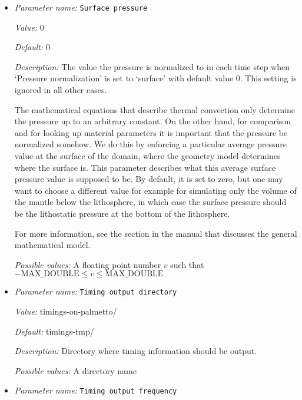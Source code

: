 \begin{itemize}
{\it Possible values:} A floating point number $v$ such that $-\text{MAX\_DOUBLE} \leq v \leq \text{MAX\_DOUBLE}$
\item {\it Parameter name:} {\tt Surface pressure}
\label{parameters:Surface pressure}
\label{parameters:Surface_20pressure}


{\it Value:} 0


{\it Default:} 0


{\it Description:} The value the pressure is normalized to in each time step when `Pressure normalization' is set to `surface' with default value 0. This setting is ignored in all other cases.

The mathematical equations that describe thermal convection only determine the pressure up to an arbitrary constant. On the other hand, for comparison and for looking up material parameters it is important that the pressure be normalized somehow. We do this by enforcing a particular average pressure value at the surface of the domain, where the geometry model determines where the surface is. This parameter describes what this average surface pressure value is supposed to be. By default, it is set to zero, but one may want to choose a different value for example for simulating only the volume of the mantle below the lithosphere, in which case the surface pressure should be the lithostatic pressure at the bottom of the lithosphere.

For more information, see the section in the manual that discusses the general mathematical model.


{\it Possible values:} A floating point number $v$ such that $-\text{MAX\_DOUBLE} \leq v \leq \text{MAX\_DOUBLE}$
\item {\it Parameter name:} {\tt Timing output directory}
\label{parameters:Timing output directory}
\label{parameters:Timing_20output_20directory}


{\it Value:} timings-on-palmetto/


{\it Default:} timings-tmp/


{\it Description:} Directory where timing information should be output.


{\it Possible values:} A directory name
\item {\it Parameter name:} {\tt Timing output frequency}
\label{parameters:Timing output frequency}
\label{parameters:Timing_20output_20frequency}



\end{itemize}
